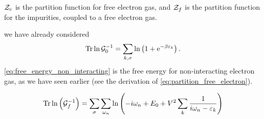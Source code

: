 $\mathcal{Z}_c$ is the partition function for free electron gas, and $\mathcal{Z}_f$ is the partition function for the impurities, coupled to a free electron gas.

we have already considered
\begin{equation}
\label{eq:free_energy_non_interacting}
	\Tr\ln\mathcal{G}_0^{-1} = \sum_{k,\sigma}\ln\left(1 + \mathrm{e}^{-\beta\varepsilon_k}\right).
\end{equation}
\eqref{eq:free_energy_non_interacting} is the free energy for non-interacting electron gas, as we have seen earlier (see the derivation of \eqref{eq:partition_free_electron}).

\begin{equation}
\label{eq:trace_impurities}
	\Tr\ln\left(\mathcal{G}_f^{-1}\right) = \sum_\sigma\sum_{\omega_n}\ln\left(-i\omega_n + E_0 +V^2\sum_k \frac{1}{i\omega_n - \varepsilon_k}\right)
\end{equation}

